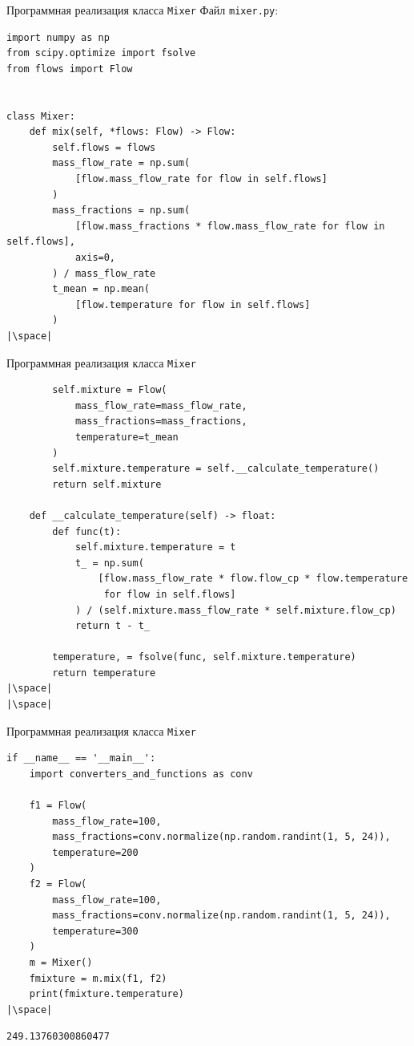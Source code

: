 \documentclass[aspectratio=169, mathserif]{beamer}	%
\begin{document}
\begin{frame}[fragile]{Программная реализация класса \texttt{Mixer}}
\scriptsize
Файл \texttt{mixer.py}:
\begin{verbatim}
import numpy as np
from scipy.optimize import fsolve
from flows import Flow


class Mixer:
    def mix(self, *flows: Flow) -> Flow:
        self.flows = flows
        mass_flow_rate = np.sum(
            [flow.mass_flow_rate for flow in self.flows]
        )
        mass_fractions = np.sum(
            [flow.mass_fractions * flow.mass_flow_rate for flow in self.flows],
            axis=0,
        ) / mass_flow_rate
        t_mean = np.mean(
            [flow.temperature for flow in self.flows]
        )
|\space|
\end{verbatim}
\vfill
\end{frame}

\begin{frame}[fragile]{Программная реализация класса \texttt{Mixer}}
\scriptsize
\begin{verbatim}
        self.mixture = Flow(
            mass_flow_rate=mass_flow_rate,
            mass_fractions=mass_fractions,
            temperature=t_mean
        )
        self.mixture.temperature = self.__calculate_temperature()
        return self.mixture

    def __calculate_temperature(self) -> float:
        def func(t):
            self.mixture.temperature = t
            t_ = np.sum(
                [flow.mass_flow_rate * flow.flow_cp * flow.temperature
                 for flow in self.flows]
            ) / (self.mixture.mass_flow_rate * self.mixture.flow_cp)
            return t - t_

        temperature, = fsolve(func, self.mixture.temperature)
        return temperature
|\space|
|\space|
\end{verbatim}
\vfill
\end{frame}

\begin{frame}[fragile]{Программная реализация класса \texttt{Mixer}}
\scriptsize
\begin{verbatim}
if __name__ == '__main__':
    import converters_and_functions as conv

    f1 = Flow(
        mass_flow_rate=100,
        mass_fractions=conv.normalize(np.random.randint(1, 5, 24)),
        temperature=200
    )
    f2 = Flow(
        mass_flow_rate=100,
        mass_fractions=conv.normalize(np.random.randint(1, 5, 24)),
        temperature=300
    )
    m = Mixer()
    fmixture = m.mix(f1, f2)
    print(fmixture.temperature)
|\space|
\end{verbatim}
\begin{verbatim}
249.13760300860477
\end{verbatim}
\vfill
\end{frame}
\end{document}
